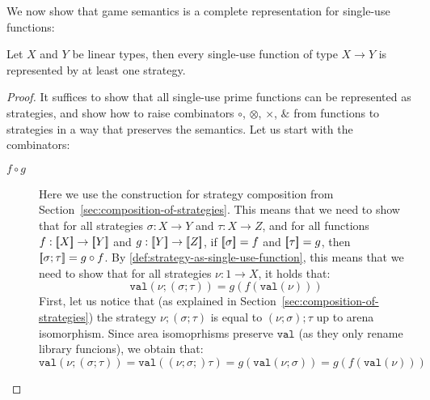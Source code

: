 We now show that game semantics is a complete representation for single-use functions:
\begin{lemma}
    Let $X$ and $Y$ be linear types, then every single-use function of type $X \to Y$ is represented by at least one strategy. 
\end{lemma}
\begin{proof}
    It suffices to show that all single-use prime functions can be represented as strategies,
    and show how to raise combinators $\circ$, $\otimes$, $\times$, $\&$ from functions to 
    strategies in a way that preserves the semantics. Let us start with the combinators:
    \begin{description}
        \item[$f \circ g$] Here we use the construction for strategy composition from Section~\ref{sec:composition-of-strategies}.
        This means that we need to show that for all strategies $\sigma : X \to Y$ and $\tau: X \to Z$, 
        and for all functions $f : [{\kern-0.45ex}[X]{\kern-0.45ex}] \to [{\kern-0.45ex}[Y]{\kern-0.45ex}]$ and $g: [{\kern-0.45ex}[Y]{\kern-0.45ex}] \to [{\kern-0.45ex}[Z]{\kern-0.45ex}]$,
        if $[{\kern-0.45ex}[\sigma]{\kern-0.45ex}] = f$ and $[{\kern-0.45ex}[\tau]{\kern-0.45ex}] =g$, then $[{\kern-0.45ex}[\sigma; \tau]{\kern-0.45ex}] = g \circ f$. By \ref{def:strategy-as-single-use-function}, 
        this means that we need to show that for all strategies $\nu : 1 \to X$, it holds that: 
        \[ \mathtt{val}(\nu; (\sigma; \tau)) = g(f(\mathtt{val}(\nu))) \]
        First, let us notice that (as explained in Section~\ref{sec:composition-of-strategies}) 
        the strategy $\nu; (\sigma; \tau)$ is equal to $(\nu; \sigma); \tau$ up to arena isomorphism. 
        Since area isomoprhisms preserve $\mathtt{val}$ (as they only rename library funcions), 
        we obtain that:
        \[ \mathtt{val}(\nu; (\sigma; \tau)) = \mathtt{val}((\nu; \sigma;) \tau) = g(\mathtt{val}(\nu; \sigma)) = g(f(\mathtt{val}(\nu))) \]


\end{description}
\end{proof}
